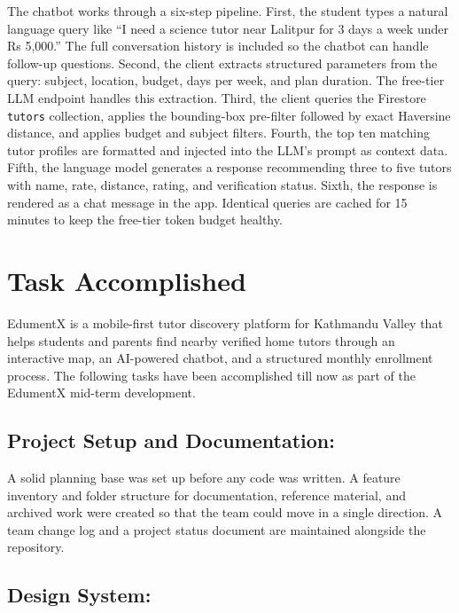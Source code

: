 \documentclass[12pt]{report}
\begin{document}
The chatbot works through a six-step pipeline. First, the
student types a natural language query like ``I need a science
tutor near Lalitpur for 3 days a week under Rs 5,000.'' The
full conversation history is included so the chatbot can
handle follow-up questions. Second, the client extracts
structured parameters from the query: subject, location,
budget, days per week, and plan duration. The free-tier
LLM endpoint handles this extraction. Third, the client queries the Firestore
\texttt{tutors} collection, applies the bounding-box
pre-filter followed by exact Haversine distance, and applies
budget and subject filters. Fourth, the top ten matching
tutor profiles are formatted and injected into the LLM's
prompt as context data. Fifth, the language model generates
a response recommending three to five tutors with name, rate,
distance, rating, and verification status. Sixth, the
response is rendered as a chat message in the app. Identical
queries are cached for 15 minutes to keep the free-tier
token budget healthy.

\chapter{Task Accomplished}

EdumentX is a mobile-first tutor discovery platform for
Kathmandu Valley that helps students and parents find nearby
verified home tutors through an interactive map, an
AI-powered chatbot, and a structured monthly enrollment
process. The following tasks have been accomplished till
now as part of the EdumentX mid-term development.

\section{Project Setup and Documentation:}

A solid planning base was set up before any code was written.
A feature inventory and folder structure for documentation,
reference material, and archived work were created so that
the team could move in a single direction. A team change
log and a project status document are maintained alongside
the repository.

\section{Design System:}
\end{document}
